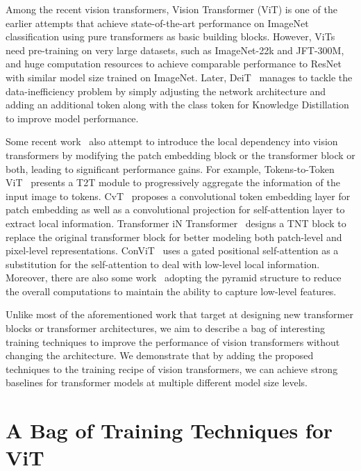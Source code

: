 \documentclass[10pt,twocolumn,letterpaper]{article}
\begin{document}
Among the recent vision transformers, Vision Transformer (ViT) is one of the earlier attempts 
that achieve state-of-the-art performance on ImageNet classification using pure transformers
as basic building blocks.
However, ViTs need pre-training on very large datasets, such as ImageNet-22k and JFT-300M,
and huge computation resources to achieve comparable performance to ResNet~\cite{he2016deep} with similar model size
trained on ImageNet.
Later, DeiT~\cite{touvron2020training} manages to tackle the data-inefficiency problem 
by simply adjusting the network architecture and adding an additional token along with the class token 
for Knowledge Distillation~\cite{hinton2015distilling, yuan2020revisiting} to improve model performance.

Some recent work~\cite{yuan2021tokens,chen2021crossvit,wu2021cvt,han2021transformer} also attempt
to introduce the local dependency into vision transformers by modifying the patch embedding block 
or the transformer block or both, leading to significant performance gains.
For example, Tokens-to-Token ViT~\cite{yuan2021tokens} presents a T2T module to progressively
aggregate the information of the input image to tokens.
CvT~\cite{wu2021cvt} proposes a convolutional token embedding layer for patch embedding 
as well as a convolutional projection for self-attention layer to extract local information.
Transformer iN Transformer~\cite{han2021transformer} designs a TNT block to replace 
the original transformer block for better modeling both patch-level and pixel-level representations.
ConViT~\cite{d2021convit} uses a gated positional self-attention as a substitution 
for the self-attention to deal with low-level local information.
Moreover, there are also some work~\cite{wang2021pyramid,heo2021rethinking,liu2021swin} adopting
the pyramid structure to reduce the overall computations to maintain the ability to capture low-level features.


Unlike most of the aforementioned work that target at designing new transformer blocks or transformer architectures, 
we aim to describe a bag of interesting training techniques to
improve the performance of vision transformers without changing the architecture. We demonstrate that by adding the proposed techniques to the training recipe of vision transformers,
we can achieve strong baselines for transformer models at multiple different model size levels.





\section{A Bag of Training Techniques for ViT}
\end{document}

